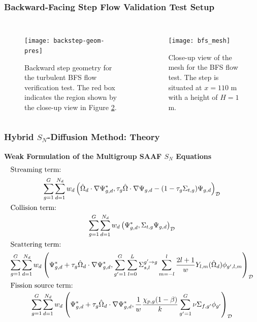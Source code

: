 \begin{frame}[noframenumbering]
  \frametitle{Backward-Facing Step Flow Validation Test Setup}
  \begin{columns}
    \column{5.5cm}
    \begin{figure}[h]
      \centering
      \texttt{[image: backstep-geom-pres]}
      \caption{Backward step geometry for the turbulent BFS flow verification test. The red box indicates
      the region shown by the close-up view in Figure \ref{fig:bfs-mesh}.}
      \label{fig:backstep-geom}
    \end{figure}
    \column{5.5cm}
    \begin{figure}[h]
      \centering
      \texttt{[image: bfs\_mesh]}
      \caption{Close-up view of the mesh for the BFS flow test. The step is situated at $x=110$ m
      with a height of $H=1$ m.}
      \label{fig:bfs-mesh}
    \end{figure}
  \end{columns}
\end{frame}

\begin{frame}[noframenumbering]
  \frametitle{Hybrid $S_N$-Diffusion Method: Theory}
  \textbf{Weak Formulation of the Multigroup SAAF $S_N$ Equations}
  \begin{gather}
    \shortintertext{Streaming term:}
    \sum^G_{g=1}\sum^{N_d}_{d=1}w_d\left(\hat{\Omega}_d\cdot\nabla\Psi^*_{g,d},\tau_g\hat{\Omega}
    \cdot\nabla\Psi_{g,d}-(1-\tau_g\Sigma_{t,g})\Psi_{g,d}\right)_\mathcal{D} \\
    \shortintertext{Collision term: }
    \sum^G_{g=1}\sum^{N_d}_{d=1}w_d\left(\Psi^*_{g,d},\Sigma_{t,g}\Psi_{g,d}\right)_\mathcal{D} \\
    \shortintertext{Scattering term:}
    \sum^G_{g=1}\sum^{N_d}_{d=1}w_d\left(\Psi^*_{g,d}+\tau_g\hat{\Omega}_d\cdot\nabla\Psi^*_{g,d},
    \sum^G_{g'=1}\sum^L_{l=0}\Sigma^{g'\rightarrow g}_{s,l}\sum^l_{m=-l}
    \frac{2l+1}{w}Y_{l,m}(\hat{\Omega}_d)\phi_{g',l,m}\right)_\mathcal{D} \\
    \shortintertext{Fission source term: }
    \sum^G_{g=1}\sum^{N_d}_{d=1}w_d\left(\Psi^*_{g,d}+\tau_g\hat{\Omega}_d\cdot\nabla\Psi^*_{g,d},
    \frac{1}{w}\frac{\chi_{p,g}(1-\beta)}{k}\sum^G_{g'=1}\nu\Sigma_{f,g'}\phi_{g'}\right)_\mathcal{D}
  \end{gather}
\end{frame}

